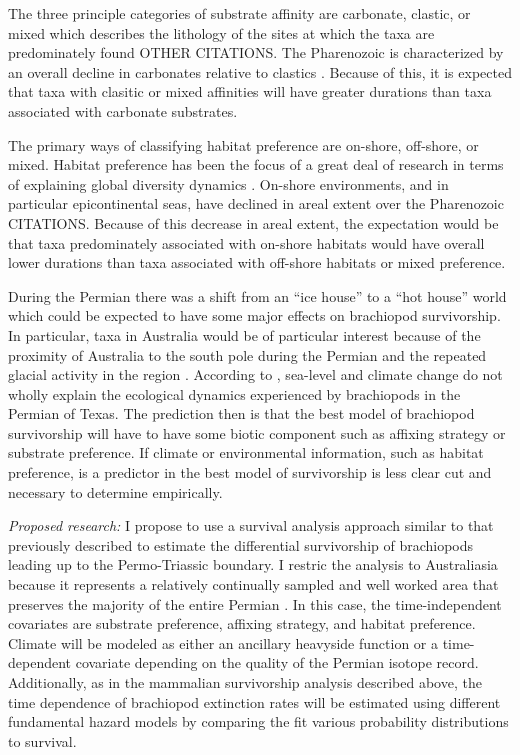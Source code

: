 \documentclass[12pt,letterpaper]{article}
\begin{document}
The three principle categories of substrate affinity are carbonate, clastic, or mixed which describes the lithology of the sites at which the taxa are predominately found \citep{Foote2006} OTHER CITATIONS. The Pharenozoic is characterized by an overall decline in carbonates relative to clastics \citep{Foote2006,Miller2001}. Because of this, it is expected that taxa with clasitic or mixed affinities will have greater durations than taxa associated with carbonate substrates. %

The primary ways of classifying habitat preference are on-shore, off-shore, or mixed. Habitat preference has been the focus of a great deal of research in terms of explaining global diversity dynamics \citep{Sepkoski1991}. On-shore environments, and in particular epicontinental seas, have declined in areal extent over the Pharenozoic CITATIONS. Because of this decrease in areal extent, the expectation would be that taxa predominately associated with on-shore habitats would have overall lower durations than taxa associated with off-shore habitats or mixed preference.

During the Permian there was a shift from an ``ice house'' to a ``hot house'' world \citep{Fielding2006,Birgenheier2010,Jones2006,Powell2007} which could be expected to have some major effects on brachiopod survivorship. In particular, taxa in Australia would be of particular interest because of the proximity of Australia to the south pole during the Permian and the repeated glacial activity in the region \citep{Fielding2006,Birgenheier2010,Jones2006}. According to \citet{Olszewski2004}, sea-level and climate change do not wholly explain the ecological dynamics experienced by brachiopods in the Permian of Texas. The prediction then is that the best model of brachiopod survivorship will have to have some biotic component such as affixing strategy or substrate preference. If climate or environmental information, such as habitat preference, is a predictor in the best model of survivorship is less clear cut and necessary to determine empirically.


\textit{Proposed research:}
I propose to use a survival analysis approach similar to that previously described to estimate the differential survivorship of brachiopods leading up to the Permo-Triassic boundary. I restric the analysis to Australiasia because it represents a relatively continually sampled and well worked area that preserves the majority of the entire Permian \citep{Clapham2012,Clapham2008a,Waterhouse1987,Archbold1995}. In this case, the time-independent covariates are substrate preference, affixing strategy, and habitat preference. Climate will be modeled as either an ancillary heavyside function or a time-dependent covariate depending on the quality of the Permian isotope record. Additionally, as in the mammalian survivorship analysis described above, the time dependence of brachiopod extinction rates will be estimated using different fundamental hazard models by comparing the fit various probability distributions to survival.
\end{document}
